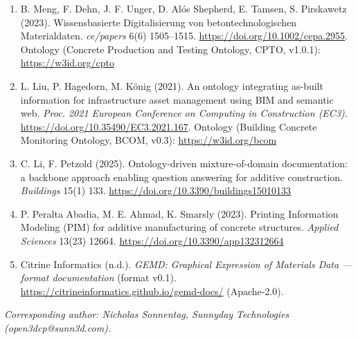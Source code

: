 \documentclass[
  11pt,
  letterpaper,
]{article}
\providecommand{\tightlist}{%
  \setlength{\itemsep}{0pt}\setlength{\parskip}{0pt}}
\begin{document}
\begin{enumerate}
  \begin{enumerate}
  \def\labelenumii{\arabic{enumii}.}
  \setcounter{enumii}{112602}
  \tightlist
  \item
    \url{https://doi.org/10.1016/j.matdes.2023.112603}
  \end{enumerate}
\item
  B. Meng, F. Dehn, J. F. Unger, D. Alós Shepherd, E. Tamsen, S.
  Pirskawetz (2023). Wissensbasierte Digitalisierung von
  betontechnologischen Materialdaten. \emph{ce/papers} 6(6) 1505--1515.
  \url{https://doi.org/10.1002/cepa.2955}. Ontology (Concrete Production
  and Testing Ontology, CPTO, v1.0.1): \url{https://w3id.org/cpto}
\item
  L. Liu, P. Hagedorn, M. König (2021). An ontology integrating as-built
  information for infrastructure asset management using BIM and semantic
  web. \emph{Proc. 2021 European Conference on Computing in Construction
  (EC3).} \url{https://doi.org/10.35490/EC3.2021.167}. Ontology
  (Building Concrete Monitoring Ontology, BCOM, v0.3):
  \url{https://w3id.org/bcom}
\item
  C. Li, F. Petzold (2025). Ontology-driven mixture-of-domain
  documentation: a backbone approach enabling question answering for
  additive construction. \emph{Buildings} 15(1) 133.
  \url{https://doi.org/10.3390/buildings15010133}
\item
  P. Peralta Abadia, M. E. Ahmad, K. Smarsly (2023). Printing
  Information Modeling (PIM) for additive manufacturing of concrete
  structures. \emph{Applied Sciences} 13(23) 12664.
  \url{https://doi.org/10.3390/app132312664}
\item
  Citrine Informatics (n.d.). \emph{GEMD: Graphical Expression of
  Materials Data --- format documentation} (format v0.1).
  \url{https://citrineinformatics.github.io/gemd-docs/} (Apache-2.0).
\end{enumerate}

\emph{Corresponding author: Nicholas Sonnentag, Sunnyday Technologies
(open3dcp@sunn3d.com).}
\end{document}
